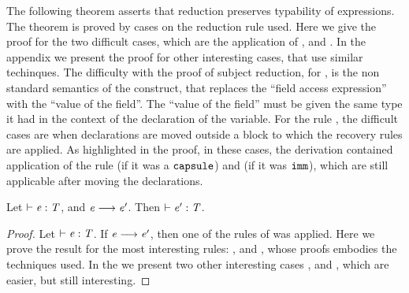 {The following theorem asserts that reduction preserves typability of expressions. The theorem is proved
by cases on the reduction rule used.
Here we give the proof for the two difficult cases, which are the application of , and .
In the appendix we present the proof for other interesting cases, that use similar techinques.
The difficulty with the proof of subject reduction, for , is the non standard semantics of  the 
construct, that replaces the ``field access expression'' with the ``value of the
field''. The ``value of the field'' must be given the same type it had in the context of the declaration of the variable.
For the rule , the difficult cases are when declarations are moved outside a block to which
the recovery rules are applied. As highlighted in the proof, in these cases, the derivation contained application 
of the rule  (if it was a $\texttt{capsule}$) and  (if it was $\texttt{imm}$), which are still applicable after
moving the declarations.

\begin{theorem}\label{theo:subjectReductionShort}
Let $\vdash \mathit{e}:\mathit{T}$, and
${\mathit{e}}\longrightarrow{\mathit{e}'}$. Then $\vdash \mathit{e}':\mathit{T}$.
\end{theorem}
\begin{proof} 
Let $\vdash \mathit{e}:\mathit{T}$. If ${\mathit{e}}\longrightarrow{\mathit{e}'}$, then one of the
rules of  was applied. 
Here we prove the result for the most interesting rules: , and , whose proofs embodies
the techniques used. In the  we present two other interesting cases  , and , which are easier, but still interesting.


\end{proof}}
